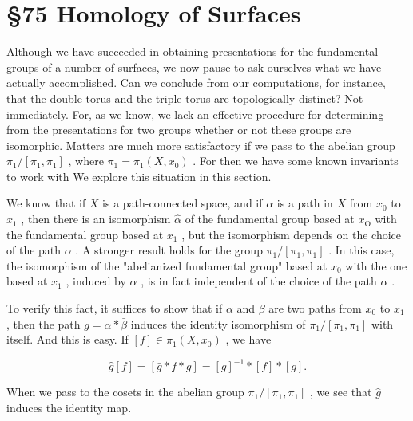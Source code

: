 \section*{ \S 75 Homology of Surfaces}

Although we have succeeded in obtaining presentations for the fundamental groups of a number of surfaces, we now pause to ask ourselves what we have actually accomplished. Can we conclude from our computations, for instance, that the double torus and the triple torus are topologically distinct? Not immediately. For, as we know, we lack an effective procedure for determining from the presentations for two groups whether or not these groups are isomorphic. Matters are much more satisfactory if we pass to the abelian group \({\pi }_{1}/\left\lbrack  {{\pi }_{1},{\pi }_{1}}\right\rbrack\) , where \({\pi }_{1} = {\pi }_{1}\left( {X,{x}_{0}}\right)\) . For then we have some known invariants to work with We explore this situation in this section.

We know that if \(X\) is a path-connected space, and if \(\alpha\) is a path in \(X\) from \({x}_{0}\) to \({x}_{1}\) , then there is an isomorphism \(\widehat{\alpha }\) of the fundamental group based at \({x}_{\mathrm{O}}\) with the fundamental group based at \({x}_{1}\) , but the isomorphism depends on the choice of the path \(\alpha\) . A stronger result holds for the group \({\pi }_{1}/\left\lbrack  {{\pi }_{1},{\pi }_{1}}\right\rbrack\) . In this case, the isomorphism of the "abelianized fundamental group" based at \({x}_{0}\) with the one based at \({x}_{1}\) , induced by \(\alpha\) , is in fact independent of the choice of the path \(\alpha\) .

To verify this fact, it suffices to show that if \(\alpha\) and \(\beta\) are two paths from \({x}_{0}\) to \({x}_{1}\) , then the path \(g = \alpha  * \bar{\beta }\) induces the identity isomorphism of \({\pi }_{1}/\left\lbrack  {{\pi }_{1},{\pi }_{1}}\right\rbrack\) with itself. And this is easy. If \(\left\lbrack  f\right\rbrack   \in  {\pi }_{1}\left( {X,{x}_{0}}\right)\) , we have

\[
\widehat{g}\left\lbrack  f\right\rbrack   = \left\lbrack  {\bar{g} * f * g}\right\rbrack   = {\left\lbrack  g\right\rbrack  }^{-1} * \left\lbrack  f\right\rbrack   * \left\lbrack  g\right\rbrack  .
\]

When we pass to the cosets in the abelian group \({\pi }_{1}/\left\lbrack  {{\pi }_{1},{\pi }_{1}}\right\rbrack\) , we see that \(\widehat{g}\) induces the identity map.

